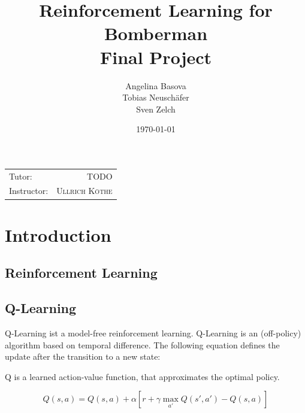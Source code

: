 \documentclass[
	letterpaper, %
	12pt, %
]{CSUniSchoolLabReport}
\title{\textbf{Reinforcement Learning for Bomberman \\ Final Project}} %
\author{Angelina Basova \\ Tobias Neuschäfer \\Sven Zelch} %
\date{\today} %
\begin{document}
\maketitle %

\begin{center}
	\begin{tabular}{l r}
		Tutor:      & TODO                     \\
		Instructor: & \textsc{Ullrich K\"othe} %
	\end{tabular}
\end{center}



\newpage

\tableofcontents
\newpage

\listoffigures
\listoftables
\newpage



\section{Introduction}

\subsection{Reinforcement Learning}

\subsection{Q-Learning \AB}
Q-Learning ist a model-free reinforcement learning.
Q-Learning is an (off-policy) algorithm based on temporal difference.
The following equation
defines the update after the transition to a new state:

Q is a learned action-value function, that approximates the
optimal policy.

\[Q(s,a) = Q(s,a) + \alpha[r + \gamma \max_{a'} Q(s', a') - Q(s,a)] \]

\end{document}
